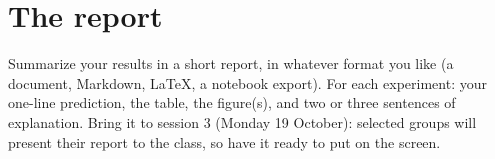 \documentclass[11pt]{article}
\newcounter{exp}
\begin{document}
\section*{The report}
Summarize your results in a short report, in whatever format you like (a document, Markdown, \LaTeX, a notebook export). For each experiment: your one-line prediction, the table, the figure(s), and two or three sentences of explanation. Bring it to session 3 (Monday 19 October): selected groups will present their report to the class, so have it ready to put on the screen.%
\end{document}
